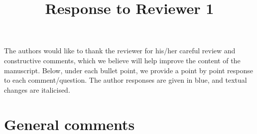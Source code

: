 \documentclass[11pt,a4paper,draft]{article}
\begin{document}
	\title{\textbf{Response to Reviewer 1}}
	\date{}
	\maketitle


The authors would like to thank the reviewer for his/her careful review and constructive comments, which we believe will help improve the content of the manuscript.  Below, under each bullet point, we provide a point by point response to each comment/question. The author responses are given in blue, and textual changes are italicised.  

\section*{General comments}
\end{document}
